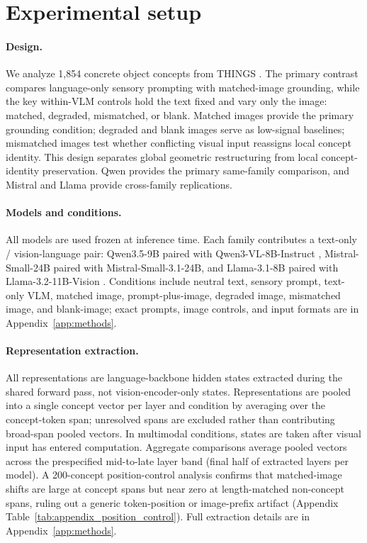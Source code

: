 \documentclass{article}
\begin{document}
\section{Experimental setup}

\paragraph{Design.}
We analyze 1,854 concrete object concepts from THINGS \citep{hebart2020things}. The primary contrast compares language-only sensory prompting with matched-image grounding, while the key within-VLM controls hold the text fixed and vary only the image: matched, degraded, mismatched, or blank. Matched images provide the primary grounding condition; degraded and blank images serve as low-signal baselines; mismatched images test whether conflicting visual input reassigns local concept identity. This design separates global geometric restructuring from local concept-identity preservation. Qwen provides the primary same-family comparison, and Mistral and Llama provide cross-family replications.

\paragraph{Models and conditions.}
All models are used frozen at inference time. Each family contributes a text-only / vision-language pair: Qwen3.5-9B paired with Qwen3-VL-8B-Instruct \citep{qwen35,qwen3vl}, Mistral-Small-24B paired with Mistral-Small-3.1-24B, and Llama-3.1-8B paired with Llama-3.2-11B-Vision \citep{mistral_small,llama31_32}. Conditions include neutral text, sensory prompt, text-only VLM, matched image, prompt-plus-image, degraded image, mismatched image, and blank-image; exact prompts, image controls, and input formats are in Appendix~\ref{app:methods}.

\paragraph{Representation extraction.}
All representations are language-backbone hidden states extracted during the shared forward pass, not vision-encoder-only states. Representations are pooled into a single concept vector per layer and condition by averaging over the concept-token span; unresolved spans are excluded rather than contributing broad-span pooled vectors. In multimodal conditions, states are taken after visual input has entered computation. Aggregate comparisons average pooled vectors across the prespecified mid-to-late layer band (final half of extracted layers per model). A 200-concept position-control analysis confirms that matched-image shifts are large at concept spans but near zero at length-matched non-concept spans, ruling out a generic token-position or image-prefix artifact (Appendix Table~\ref{tab:appendix_position_control}). Full extraction details are in Appendix~\ref{app:methods}.
\end{document}
